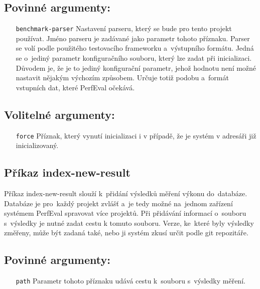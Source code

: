 \subsection*{Povinné argumenty:}
\begin{itemize}[label=\texttt{\textbf{\textendash}}]
    \item[\texttt{benchmark-parser}] Nastavení parseru, který se bude pro tento projekt používat.
        Jméno parseru je zadávané jako parametr tohoto příznaku.
        Parser se volí podle použitého testovacího frameworku a~výstupního formátu.
        Jedná se o~jediný parametr konfiguračního souboru, který lze zadat při inicializaci.
        Důvodem je, že je to jediný konfigurační parametr, jehož hodnotu není možné nastavit nějakým výchozím způsobem.
        Určuje totiž podobu a~formát vstupních dat, které PerfEval očekává.
\end{itemize}

\subsection*{Volitelné argumenty:}
\begin{itemize}[label=\texttt{\textbf{\textendash}}]
    \item[\texttt{force}] Příznak, který vynutí inicializaci i v případě, že je systém v adresáři již inicializovaný.
\end{itemize}

\subsection{Příkaz index-new-result}

Příkaz index-new-result slouží k~přidání výsledků měření výkonu do~databáze. Databáze
je pro~každý projekt zvlášť a~je tedy možné na~jednom zařízení systémem PerfEval spravovat více projektů.
Při přidávání informací o~souboru s~výsledky je nutné zadat cestu k tomuto souboru.
Verze, ke~které byly výsledky změřeny, může být zadaná také, nebo ji systém zkusí určit
podle git repozitáře.

\subsection*{Povinné argumenty:}
\begin{itemize}[label=\texttt{\textbf{\textendash}}]
    \item[\texttt{path}] Parametr tohoto příznaku udává cestu k~souboru s~výsledky měření.
\end{itemize}

